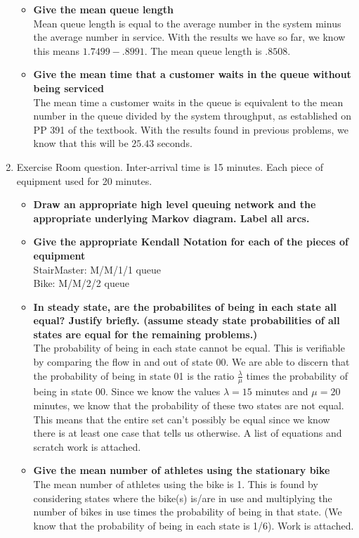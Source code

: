 \documentclass[11pt]{article}
\begin{document}
\begin{enumerate}
\begin{itemize}
		\item \textbf{Give the mean queue length}
		\\Mean queue length is equal to the average number in the system minus the average number in service. With the results we have so far, we know this means $1.7499 - .8991$. The mean queue length is $.8508$.
		\item \textbf{Give the mean time that a customer waits in the queue without being serviced}
		\\The mean time a customer waits in the queue is equivalent to the mean number in the queue divided by the system throughput, as established on PP 391 of the textbook. With the results found in previous problems, we know that this will be $25.43$ seconds.
	\end{itemize}
	
	\item Exercise Room question. Inter-arrival time is 15 minutes. Each piece of equipment used for 20 minutes.
	\begin{itemize}
		\item \textbf{Draw an appropriate high level queuing network and the appropriate underlying Markov diagram. Label all arcs.}
		\vskip 10cm
		\item \textbf{Give the appropriate Kendall Notation for each of the pieces of equipment}
		\\StairMaster:  M/M/1/1 queue
		\\Bike:  M/M/2/2 queue
		\item \textbf{In steady state, are the probabilites of being in each state all equal? Justify briefly. (assume steady state probabilities of all states are equal for the remaining problems.)}
		\\The probability of being in each state cannot be equal. This is verifiable by comparing the flow in and out of state 00. We are able to discern that the probability of being in state 01 is the ratio $\frac{\lambda}{\mu}$ times the probability of being in state 00. Since we know the values $\lambda = 15$ minutes and $\mu = 20$ minutes, we know that the probability of these two states are not equal. This means that the entire set can't possibly be equal since we know there is at least one case that tells us otherwise. A list of equations and scratch work is attached.
		\item \textbf{Give the mean number of athletes using the stationary bike}
		\\The mean number of athletes using the bike is 1. This is found by considering states where the bike(s) is/are in use and multiplying the number of bikes in use times the probability of being in that state. (We know that the probability of being in each state is 1/6). Work is attached.

\end{itemize}
\end{enumerate}
\end{document}
